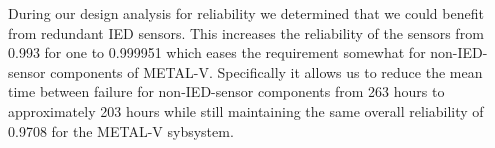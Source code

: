 \documentclass[letterpaper,10pt]{article}
\begin{document}
\begin{enumerate}
			\par During our design analysis for reliability we determined that we could benefit from redundant IED sensors.  This increases the reliability of the sensors from 0.993 for one to 0.999951 which eases the requirement somewhat for non-IED-sensor components of METAL-V.  Specifically it allows us to reduce the mean time between failure for non-IED-sensor components from 263 hours to approximately 203 hours while still maintaining the same overall reliability of 0.9708 for the METAL-V sybsystem.
	\end {enumerate}
\end{document}

